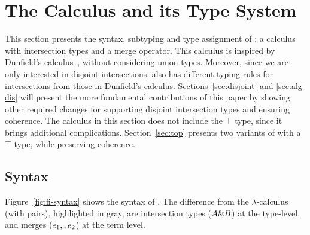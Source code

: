 \section{The \name Calculus and its Type System}
\label{sec:fi}

This section presents the syntax, subtyping and type assignment of \name: 
a calculus with intersection types and a merge
operator.  This calculus is inspired by Dunfield's
calculus~\cite{dunfield2014elaborating}, without 
considering union types. Moreover, since we are only
interested in disjoint intersections, \name also has different
typing rules for intersections from those in Dunfield's calculus. Sections~\ref{sec:disjoint}
and \ref{sec:alg-dis} will present the more fundamental contributions
of this paper by showing other required changes for supporting
disjoint intersection types and ensuring coherence. The calculus in
this section does not include the $\top$ type, since it brings 
additional complications.  Section~\ref{sec:top} presents two variants of
\name with a $\top$ type, while preserving coherence.

\subsection{Syntax}

Figure~\ref{fig:fi-syntax} shows the syntax of \name. The difference from the
$\lambda$-calculus (with pairs), 
highlighted in gray, are intersection types 
($A \& B$) at the type-level, and merges ($e_1 ,, e_2$) at the term level.

